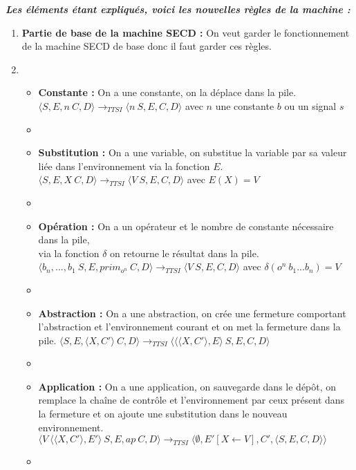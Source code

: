\documentclass[10pt,a4paper]{report}
\begin{document}
\textbf{\textit{Les éléments étant expliqués, voici les nouvelles règles de la machine :}}
\smallbreak
\begin{enumerate}
\item[] \textbf{Partie de base de la machine SECD :} On veut garder le fonctionnement de la machine SECD de base donc il faut garder ces règles.	
\item[]
  \begin{itemize}
  \item[] \textbf{Constante :} On a une constante, on la déplace dans la pile.
    \smallbreak
    $\langle S,E,n~C,D\rangle 
    \longrightarrow_{TTSI} 
    \langle n~S,E,C,D\rangle$ avec $n$ une constante $b$ ou un signal $s$
  \item[]
    
  \item[] \textbf{Substitution :} On a une variable, on substitue la variable par sa valeur liée dans l'environnement via la fonction $E$.
    \smallbreak
    $\langle S,E,X~C,D\rangle
    \longrightarrow_{TTSI} 
    \langle V~S,E,C,D\rangle$ avec $E(X) = V$
  \item[]
    
  \item[] \textbf{Opération :} On a un opérateur et le nombre de constante nécessaire dans la pile, \\via la fonction $\delta$ on retourne le résultat dans la pile.
    \smallbreak
    $\langle b_{n},...,b_{1}~S,E,prim_{o^{n}}~C,D\rangle
    \longrightarrow_{TTSI} 
    \langle V~S,E,C,D\rangle$ avec $\delta(o^{n}~b_{1}...b_{n}) = V$
  \item[]
    
  \item[]  \textbf{Abstraction :} On a une abstraction, on crée une fermeture comportant l'abstraction et l'environnement courant et on met la fermeture dans la pile.
    \smallbreak
    $\langle S,E,\langle X,C'\rangle~C,D\rangle
    \longrightarrow_{TTSI} 
    \langle \langle\langle X,C'\rangle,E\rangle~S,E,C,D\rangle$
  \item[]
    
  \item[]  \textbf{Application :} On a une application, on sauvegarde dans le dépôt, on remplace la chaîne de contrôle et l'environnement par ceux présent dans la fermeture et on ajoute une substitution  dans le nouveau environnement.
    \smallbreak
    $\langle V~\langle\langle X,C'\rangle,E'\rangle~S,E,ap~C,D\rangle
    \longrightarrow_{TTSI} 
    \langle \emptyset,E'[X \leftarrow V],C',\langle S,E,C,D\rangle\rangle$
  \item[] 
    

\end{itemize}
\end{enumerate}
\end{document}
